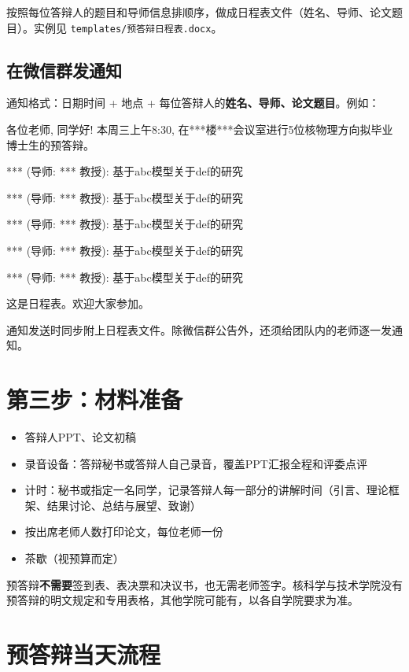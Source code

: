 \documentclass[12pt,a4paper,openany]{ctexbook}
\newcommand{\todoitem}[1]{\item[\textcolor{lzublue}{$\square$}] #1}
\begin{document}
按照每位答辩人的题目和导师信息排顺序，做成日程表文件（姓名、导师、论文题目）。实例见 \texttt{templates/预答辩日程表.docx}。

\subsection{在微信群发通知}

通知格式：日期时间 + 地点 + 每位答辩人的\textbf{姓名、导师、论文题目}。例如：

\begin{tipbox}
各位老师, 同学好! 本周三上午8:30, 在***楼***会议室进行5位核物理方向拟毕业博士生的预答辩。

\bigskip
*** (导师: *** 教授): 基于abc模型关于def的研究

*** (导师: *** 教授): 基于abc模型关于def的研究

*** (导师: *** 教授): 基于abc模型关于def的研究

*** (导师: *** 教授): 基于abc模型关于def的研究

*** (导师: *** 教授): 基于abc模型关于def的研究

\bigskip
这是日程表。欢迎大家参加。
\end{tipbox}

通知发送时同步附上日程表文件。除微信群公告外，还须给团队内的老师逐一发通知。

\section{第三步：材料准备}

\begin{itemize}
  \todoitem{答辩人PPT、论文初稿}
  \todoitem{录音设备：答辩秘书或答辩人自己录音，覆盖PPT汇报全程和评委点评}
  \todoitem{计时：秘书或指定一名同学，记录答辩人每一部分的讲解时间（引言、理论框架、结果讨论、总结与展望、致谢）}
  \todoitem{按出席老师人数打印论文，每位老师一份}
  \todoitem{茶歇（视预算而定）}
\end{itemize}

\begin{warnbox}
预答辩\textbf{不需要}签到表、表决票和决议书，也无需老师签字。核科学与技术学院没有预答辩的明文规定和专用表格，其他学院可能有，以各自学院要求为准。
\end{warnbox}

\section{预答辩当天流程}
\end{document}
